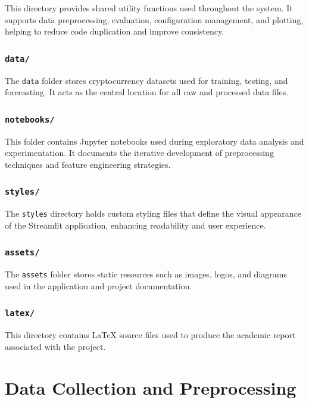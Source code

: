 \documentclass[12pt,a4paper]{report}
\begin{document}
This directory provides shared utility functions used throughout the system. It supports data preprocessing, evaluation, configuration management, and plotting, helping to reduce code duplication and improve consistency.

\subsection{\texttt{data/}}

The \texttt{data} folder stores cryptocurrency datasets used for training, testing, and forecasting. It acts as the central location for all raw and processed data files.

\subsection{\texttt{notebooks/}}

This folder contains Jupyter notebooks used during exploratory data analysis and experimentation. It documents the iterative development of preprocessing techniques and feature engineering strategies.

\subsection{\texttt{styles/}}

The \texttt{styles} directory holds custom styling files that define the visual appearance of the Streamlit application, enhancing readability and user experience.

\subsection{\texttt{assets/}}

The \texttt{assets} folder stores static resources such as images, logos, and diagrams used in the application and project documentation.

\subsection{\texttt{latex/}}

This directory contains LaTeX source files used to produce the academic report associated with the project.

\chapter*{Data Collection and Preprocessing}
\end{document}
